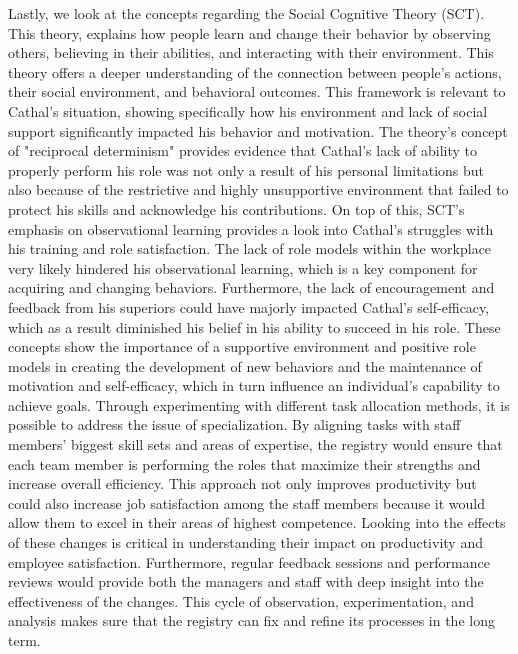 \documentclass[12pt]{article}
\begin{document}
\begin{flushleft}
\bigbreak \noindent 
\hspace{\parindent} Lastly, we look at the concepts regarding the Social Cognitive Theory (SCT). This theory, explains how people learn and change their behavior by observing others, believing in their abilities, and interacting with their environment. This theory offers a deeper understanding of the connection between people's actions, their social environment, and behavioral outcomes. This framework is relevant to Cathal's situation, showing specifically how his environment and lack of social support significantly impacted his behavior and motivation. The theory's concept of "reciprocal determinism" provides evidence that Cathal's lack of ability to properly perform his role was not only a result of his personal limitations but also because of the restrictive and highly unsupportive environment that failed to protect his skills and acknowledge his contributions.
\bigbreak \noindent 
\hspace{\parindent} On top of this, SCT's emphasis on observational learning provides a look into Cathal's struggles with his training and role satisfaction. The lack of role models within the workplace very likely hindered his observational learning, which is a key component for acquiring and changing behaviors. Furthermore, the lack of encouragement and feedback from his superiors could have majorly impacted Cathal's self-efficacy, which as a result diminished his belief in his ability to succeed in his role. These concepts show the importance of a supportive environment and positive role models in creating the development of new behaviors and the maintenance of motivation and self-efficacy, which in turn influence an individual's capability to achieve goals.
\bigbreak \noindent 
\hspace{\parindent} Through experimenting with different task allocation methods, it is possible to address the issue of specialization. By aligning tasks with staff members' biggest skill sets and areas of expertise, the registry would ensure that each team member is performing the roles that maximize their strengths and increase overall efficiency. This approach not only improves productivity but could also increase job satisfaction among the staff members because it would allow them to excel in their areas of highest competence.
\bigbreak \noindent 
\hspace{\parindent} Looking into the effects of these changes is critical in understanding their impact on productivity and employee satisfaction. Furthermore, regular feedback sessions and performance reviews would provide both the managers and staff with deep insight into the effectiveness of the changes. This cycle of observation, experimentation, and analysis makes sure that the registry can fix and refine its processes in the long term.

\end{flushleft}
\end{document}
